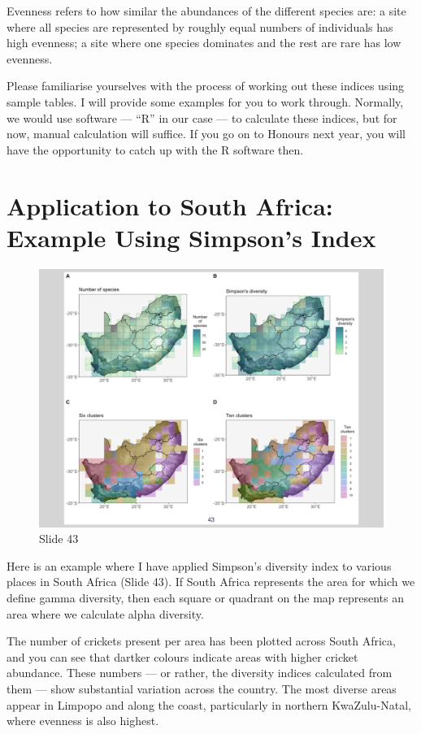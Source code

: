 \documentclass[
  11pt,
]{book}
\begin{document}
Evenness refers to how similar the abundances of the different species
are: a site where all species are represented by roughly equal numbers
of individuals has high evenness; a site where one species dominates and
the rest are rare has low evenness.

Please familiarise yourselves with the process of working out these
indices using sample tables. I will provide some examples for you to
work through. Normally, we would use software --- ``R'' in our case ---
to calculate these indices, but for now, manual calculation will
suffice. If you go on to Honours next year, you will have the
opportunity to catch up with the R software then.

\section{Application to South Africa: Example Using Simpson's
Index}\label{application-to-south-africa-example-using-simpsons-index}

\begin{figure}[ht]
\centering
\includegraphics[width=0.8\linewidth]{../images/BDC334/BDC334-043.jpeg}
\caption*{Slide 43}
\end{figure}

Here is an example where I have applied Simpson's diversity index to
various places in South Africa (Slide 43). If South Africa represents
the area for which we define gamma diversity, then each square or
quadrant on the map represents an area where we calculate alpha
diversity.

The number of crickets present per area has been plotted across South
Africa, and you can see that dartker colours indicate areas with higher
cricket abundance. These numbers --- or rather, the diversity indices
calculated from them --- show substantial variation across the country.
The most diverse areas appear in Limpopo and along the coast,
particularly in northern KwaZulu-Natal, where evenness is also highest.
\end{document}
